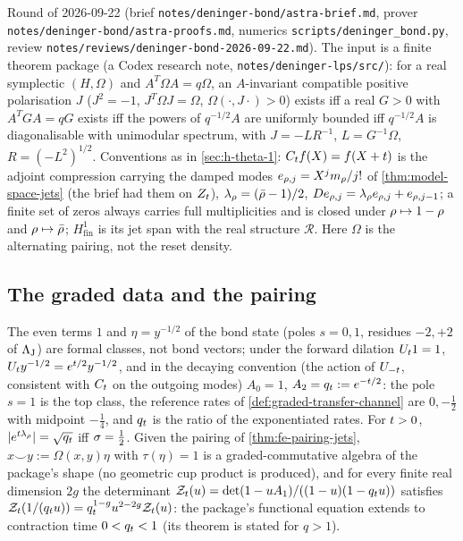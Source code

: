 Round of 2026-09-22 (brief \texttt{notes/deninger-bond/astra-brief.md}, prover \texttt{notes/deninger-bond/astra-proofs.md},
numerics \texttt{scripts/deninger\_bond.py}, review \texttt{notes/reviews/deninger-bond-2026-09-22.md}). The input is a finite
theorem package (a Codex research note, \texttt{notes/deninger-lps/src/}): for a real symplectic $(H,\Omega)$ and %
$A^{T}\Omega A = q\Omega$, an $A$-invariant compatible positive polarisation $J$ ($J^2 = -1$, $J^{T}\Omega J = \Omega$, %
$\Omega(\cdot,J\cdot)>0$) exists iff a real $G>0$ with $A^{T}GA = qG$ exists iff the powers of $q^{-1/2}A$ are uniformly %
bounded iff $q^{-1/2}A$ is diagonalisable with unimodular spectrum, with $J = -LR^{-1}$, $L = G^{-1}\Omega$, $R = (-L^2)^{1/2}$. %
Conventions as in \cref{sec:h-theta-1}: $C_t f(X) = f(X+t)$ is the adjoint compression carrying the damped modes
$e_{\rho,j} = X^jm_\rho/j!$ of \cref{thm:model-space-jets} (the brief had them on $Z_t$), $\lambda_\rho = (\bar{\rho}-1)/2$,
$De_{\rho,j} = \lambda_\rho e_{\rho,j}+e_{\rho,j-1}$; a finite set of zeros always carries full multiplicities and is closed
under $\rho\mapsto1-\rho$ and $\rho\mapsto\bar{\rho}$; $H^1_{\mathrm{fin}}$ is its jet span with the real structure
$\mathcal R$. Here $\Omega$ is the alternating pairing, not the reset density. %

\subsection{The graded data and the pairing}

\begin{proposition}
\label{prop:bond-graded-data}
The even terms $1$ and $\eta = y^{-1/2}$ of the bond state (poles $s = 0,1$, residues $-2,+2$ of $\Lambda_{\mathrm J}$) are formal
classes, not bond vectors; under the forward dilation $U_t1 = 1$, $U_t y^{-1/2} = e^{t/2}y^{-1/2}$, and in the decaying
convention (the action of $U_{-t}$, consistent with $C_t$ on the outgoing modes) $A_0 = 1$, $A_2 = q_t := e^{-t/2}$:
the pole $s = 1$ is the top class, the reference rates of \cref{def:graded-transfer-channel} are $0,-\tfrac12$ with midpoint
$-\tfrac14$, and $q_t$ is the ratio of the exponentiated rates. For $t>0$, $|e^{t\lambda_\rho}| = \sqrt{q_t}$ iff
$\sigma = \tfrac12$. Given the pairing of \cref{thm:fe-pairing-jets}, $x\smile y := \Omega(x,y)\eta$ with $\tau(\eta) = 1$ is a %
graded-commutative algebra of the package's shape (no geometric cup product is produced), and for every finite real
dimension $2g$ the determinant $\mathcal Z_t(u) = \det(1-uA_1)/((1-u)(1-q_t u))$ satisfies
$\mathcal Z_t(1/(q_t u)) = q_t^{1-g}u^{2-2g}\mathcal Z_t(u)$: the package's functional equation extends to
contraction time $0<q_t<1$ (its theorem is stated for $q>1$).
\end{proposition}

